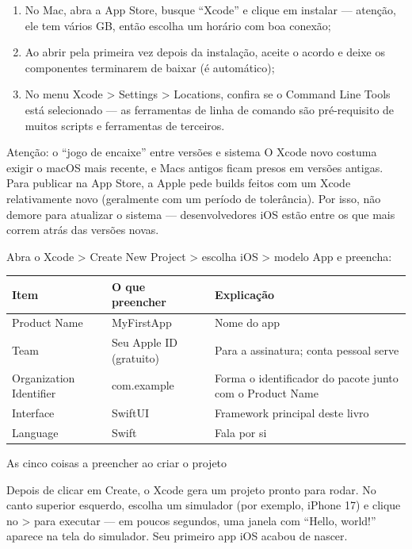 \begin{enumerate}
  \item No Mac, abra a App Store, busque “Xcode” e clique em instalar — atenção, ele tem vários GB, então escolha um horário com boa conexão;
  \item Ao abrir pela primeira vez depois da instalação, aceite o acordo e deixe os componentes terminarem de baixar (é automático);
  \item No menu Xcode > Settings > Locations, confira se o Command Line Tools está selecionado — as ferramentas de linha de comando são pré-requisito de muitos scripts e ferramentas de terceiros.
\end{enumerate}

\begin{tcbwarn}{Atenção: o “jogo de encaixe” entre versões e sistema}
O Xcode novo costuma exigir o macOS mais recente, e Macs antigos ficam presos em versões antigas. Para publicar na App Store, a Apple pede builds feitos com um Xcode relativamente novo (geralmente com um período de tolerância). Por isso, não demore para atualizar o sistema — desenvolvedores iOS estão entre os que mais correm atrás das versões novas.

\end{tcbwarn}


Abra o Xcode > Create New Project > escolha iOS > modelo App e preencha:

\begin{center}
\begin{tabularx}{\linewidth}{|X|X|X|}
\hline
\textbf{Item} & \textbf{O que preencher} & \textbf{Explicação} \tabularnewline
\hline
Product Name & MyFirstApp & Nome do app \tabularnewline
Team & Seu Apple ID (gratuito) & Para a assinatura; conta pessoal serve \tabularnewline
Organization Identifier & com.example & Forma o identificador do pacote junto com o Product Name \tabularnewline
Interface & SwiftUI & Framework principal deste livro \tabularnewline
Language & Swift & Fala por si \tabularnewline
\hline
\end{tabularx}
\end{center}

\begin{center}\small\color{gray}As cinco coisas a preencher ao criar o projeto\end{center}

Depois de clicar em Create, o Xcode gera um projeto pronto para rodar. No canto superior esquerdo, escolha um simulador (por exemplo, iPhone 17) e clique no > para executar — em poucos segundos, uma janela com “Hello, world!” aparece na tela do simulador. Seu primeiro app iOS acabou de nascer.

